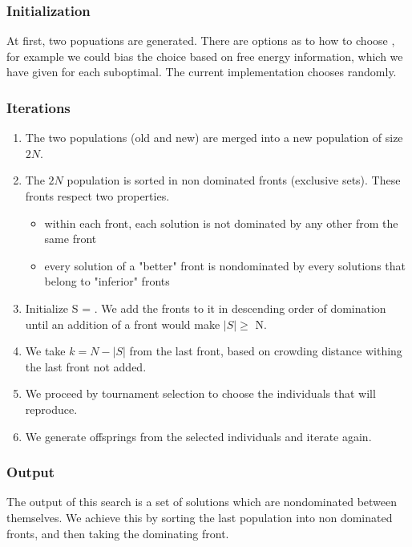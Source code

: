 \documentclass[a4paper, 12pt] {article}
\begin{document}
\subsubsection*{Initialization}
\noindent
At first, two popuations are generated. There are options as to how to choose , for example we could
bias the choice based on free energy information, which we have given for each suboptimal. The current implementation chooses randomly.


\subsubsection*{Iterations}
\begin{enumerate}
  \item The two populations (old and new) are merged into a new population of size $2N$.
  \item The $2N$ population is sorted in non dominated fronts (exclusive sets). These fronts respect two properties.	
  \begin{itemize}
    \item within each front, each solution is not dominated by any other from the same front
    \item every solution of a "better" front is nondominated by every solutions that belong to "inferior" fronts
  \end{itemize}
  \item Initialize S = {}. We add the fronts to it in descending order of domination until an addition of a front would make $\left\vert{S}\right\vert \geq$ N. 
  \item We take $k = N - \left\vert{S}\right\vert $ from the last front, based on crowding distance withing the last front not added.
  \item We proceed by tournament selection to choose the individuals that will reproduce.
  \item We generate offsprings from the selected individuals and iterate again.
\end{enumerate}
\subsubsection*{Output}
The output of this search is a set of solutions which are nondominated between themselves. We achieve this by 
sorting the last population into non dominated fronts, and then taking the dominating front.
\end{document}
